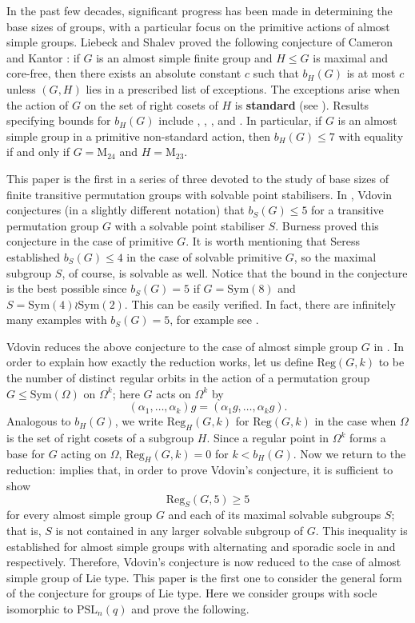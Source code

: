 \documentclass[a4paper,reqno,11pt]{amsart}
\theoremstyle{definition}
\theoremstyle{remark}
\numberwithin{equation}{section}
\newcommand{\Sym}{\mathrm{Sym}}
\newcommand{\Reg}{\mathrm{Reg}}
\newcommand{\PSL}{{\mathrm{PSL}}}
\begin{document}
In the past few decades, significant progress has been made in determining the base sizes of groups, with a particular focus on the primitive actions of almost simple groups. Liebeck and Shalev \cite{lieb} proved the following conjecture of Cameron and Kantor \cite{Camer}:  if $G$ is an almost simple finite group and $H\le G$ is maximal and core-free, then there exists an absolute constant $c$ such that $b_H(G)$  is at most   $c$ unless $(G,H)$ lies in a prescribed list of exceptions. The exceptions arise when the action of $G$ on the set of right cosets of $H$  is {\bf standard} (see \cite[Definition 1.1]{burness}). Results specifying bounds for $b_H(G)$ include \cite{burness}, \cite{bls}, \cite{spor}, \cite{mon} and \cite{sfa}. In particular, if $G$ is an almost simple group in a primitive non-standard action, then $b_H(G) \le 7$ with equality if and only if $G=\mathrm{M}_{24}$ and $H=\mathrm{M}_{23}.$

This paper is the first in a series of three devoted to the study of  base sizes of finite transitive  permutation groups with solvable point stabilisers.  In \cite[Problem 17.41 b)]{kt}, Vdovin conjectures (in a slightly different notation) that $b_S(G) \le 5$ for a transitive permutation group $G$ with a solvable point stabiliser $S$. Burness \cite{burPS} proved this conjecture in the case of primitive $G$. It is worth mentioning that Seress \cite{seress} established $b_S(G)\le 4$ in the case of solvable primitive $G$, so the maximal subgroup $S$, of course, is solvable as well. Notice that the bound in the conjecture is the best possible since $b_S(G)=5$ if $G=\Sym(8)$ and $S=\Sym(4) \wr \Sym(2).$ This can be easily verified. In fact, there are infinitely many examples with $b_S(G)=5$, for example see \cite[Remark 8.3]{burPS}.

 Vdovin reduces the above conjecture to the case of almost simple group $G$ in \cite[Theorem 1]{vd}. In order to explain how exactly the reduction works, let us define $\Reg(G,k)$ to be the number of distinct regular orbits in the  action of a permutation group $G \le \Sym(\Omega)$ on $\Omega^k$; here $G$ acts on $\Omega^k$ by $$(\alpha_1, \ldots,\alpha_k)g = (\alpha_1g,\ldots,\alpha_kg).$$ Analogous to $b_H(G)$, we write $\Reg_H(G,k)$ for $\Reg(G,k)$ in the case when $\Omega$ is the set of right cosets of a subgroup $H$. Since a regular point in $\Omega^k$ forms a base for $G$ acting on $\Omega$, $\Reg_H(G,k)=0$ for $k < b_H(G).$    Now we return to the reduction: \cite[Theorem 1]{vd} implies that, in order to prove Vdovin's conjecture,   
it is sufficient to show $$\Reg_S(G,5) \ge 5$$ for every almost simple group $G$ and each of its maximal solvable subgroups $S$; that is, $S$ is not contained in any larger solvable subgroup of $G$. This inequality is established for almost simple groups with alternating and sporadic socle in \cite{bay} and \cite{burspor} respectively. Therefore, Vdovin's conjecture is now reduced to the case of almost simple group of Lie type. This paper is the first one to consider the general form of the conjecture for groups of Lie type. Here we  consider groups with socle isomorphic to $\PSL_n(q)$ and prove the following. 
\end{document}
